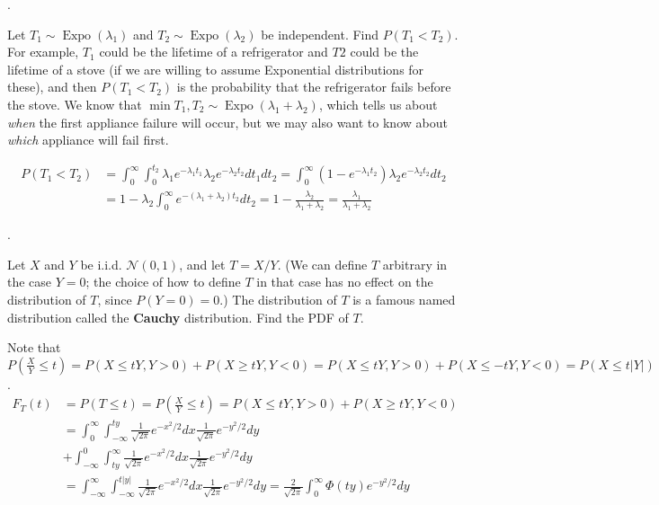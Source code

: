\documentclass[8pt]{beamer}
\newcommand{\tb}[1]{\textbf{#1}}
\newcommand{\ti}[1]{\textit{#1}}
\newcommand{\myexpo}[1]{\operatorname{Expo}\!\left(#1\right)}
\newcommand{\abs}[1]{\left\lvert #1 \right\rvert}
\begin{document}
\begin{frame}{.}
    \begin{example}
        Let $T_1 \sim \myexpo{\lambda_1}$ and $T_2 \sim \myexpo{\lambda_2}$ be independent. 
        Find $P(T_1 < T_2)$. For example, $T_1$ could be the lifetime of a refrigerator and $T2$ could be the lifetime of a stove (if we are willing to assume Exponential distributions for these), and then $P(T_1<T_2)$ is the probability that the refrigerator fails before the stove. 
        We know that $\min{T_1, T_2} \sim \myexpo{\lambda_1 + \lambda_2}$, which tells us about \ti{when} the first appliance failure will occur, but we may also want to know about \ti{which} appliance will fail first.
    \end{example}
    \[
        \begin{aligned}
            P(T_1< T_2) &= \int_{0}^\infty \int_0^{t_2} \lambda_1e^{-\lambda_1 t_1} \lambda_2 e^{-\lambda_2 t_2} dt_1 dt_2 
            = \int_0^\infty (1 - e^{-\lambda_1 t_2}) \lambda_2 e^{-\lambda_2 t_2} dt_2 \\
            &= 1 - \lambda_2\int_0^\infty e^{-(\lambda_1 + \lambda_2)t_2} dt_2 = 1- \frac{\lambda_2}{\lambda_1 + \lambda_2} = \frac{\lambda_1}{\lambda_1 + \lambda_2}
        \end{aligned}
    \]
\end{frame}

\begin{frame}{.}
    \begin{example}
        Let $X$ and $Y$ be i.i.d. $\mathcal{N}(0,1)$, and let $T = X/Y$. (We can define $T$ arbitrary in the case $Y=0$; the choice of how to define $T$ in that case has no effect on the distribution of $T$, since $P(Y=0)=0$.) The distribution of $T$ is a famous named distribution called the \tb{Cauchy} distribution. Find the PDF of $T$.
    \end{example}
    Note that $P\left(\frac{X}{Y} \leq t\right) = P(X \leq tY, Y>0) + P(X \geq tY, Y<0) = P(X\leq tY, Y>0) + P(X \leq -tY, Y<0) = P(X\leq t\abs{Y})$.
    \[
    \begin{aligned}
        F_T(t) &= P(T\leq t) = P\left(\frac{X}{Y} \leq t\right) = P(X \leq tY, Y>0) + P(X \geq tY, Y<0) \\
        &= \int_0^\infty \int_{-\infty}^{ty} \frac{1}{\sqrt{2\pi}} e^{-x^2/2}  dx \frac{1}{\sqrt{2\pi}}e^{-y^2/2}dy \\
        &+ \int_{-\infty}^0 \int_{ty}^{\infty} \frac{1}{\sqrt{2\pi}}e^{-x^2/2} dx \frac{1}{\sqrt{2\pi}} e^{-y^2/2} dy \\ 
        &= \int_{-\infty}^\infty \int_{-\infty}^{t\abs{y}} \frac{1}{\sqrt{2\pi}}e^{-x^2/2} dx \frac{1}{\sqrt{2\pi}} e^{-y^2/2} dy = \frac{2}{\sqrt{2\pi}}\int_0^\infty \Phi(ty)  e^{-y^2/2} dy
    \end{aligned}
    \]
\end{frame}
\end{document}
